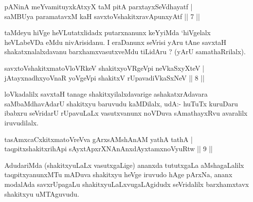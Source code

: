 
\begin{shl}
pANinA meYvamituyxkAtxyX taM pitA parxtayxSeVdhayatf | \\
\footnotemark{}saMBUya paramatavxM kaH savxtoVshakitxravApunxyAtf \hfill ||  7 || 
\end{shl}

\begin{artha}
taMdeyu hiVge heVLutatxlidadx putarxnanunx keYyiMda `hiVgelalx heVLabeVDa eMdu nivArisidanu. I eraDanunx seVrisi yAru tAne savxtaH shakatxnalalxdavanu barxhamxvasutxveMdu tiLidAru ? (yArU samathaRrilalx).
\end{artha}


\begin{shl}
savxtoV\s shakitxmatoVloVRkeV shakitxyoVRgeV\s pi neVkaSxyXteV | \\
jAtayxnadhxyoVnaR yoVgeV\s pi shakitxV rUpavadiVkaSxNeV \hfill ||  8 || 
\end{shl}

\begin{artha}
loVkadalilx savxtaH tanage shakitxyilalxdavarige ashakatxrAdavara saMbaMdhavAdarU shakitxyu baruvudu kaMDilalx, udA:- huTuTx kuruDaru ibabxru seVridarU rUpavuLaLx vasutxvanunx noVDuva sAmathayxRvu avaralilx iruvudilalx.
\end{artha}

\begin{shl}
tasAmxcaCxkitxmatoVreVva gArxsAMshAnAM yathA tathA | \\
taqpitxshakitxrihApi sAyxtApxrXNAnAnxdAyxtamxnoVyuRtw \hfill ||  9 || 
\end{shl}

\begin{artha}
AdudariMda (shakitxyuLaLx vasutxgaLige) ananxda tututxgaLa aMshagaLalilx taqpitxyanunxMTu mADuva shakitxyu heVge iruvudo hAge pArxNa, ananx modalAda savxrUpagaLu shakitxyuLaLxvugaLAgidudx seVridalilx barxhamxtavx shakitxyu uMTAguvudu.
\end{artha}


